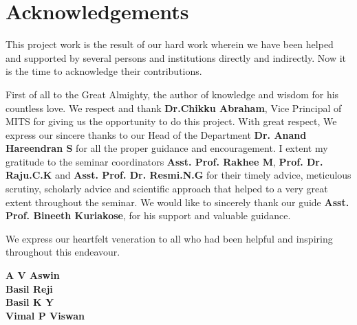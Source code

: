 \documentclass[11pt]{report}
\begin{document}
\newpage

\thispagestyle{empty}


\section*{\centering Acknowledgements}
\par This project work is the result of our hard work wherein we have been helped and supported by several persons and institutions directly and indirectly. Now it is the time to acknowledge their contributions. 

\par First of all to the Great Almighty, the author of knowledge and wisdom for his countless love. We respect and thank \textbf{Dr.Chikku Abraham}, Vice Principal of MITS for giving us the opportunity to do this project.
With great respect, We express our sincere thanks to our Head of the Department \textbf{Dr. Anand Hareendran S} for all the proper guidance and encouragement. I extent my gratitude to the seminar coordinators \textbf{Asst. Prof. Rakhee M}, \textbf{Prof. Dr. Raju.C.K} and \textbf{Asst. Prof. Dr.  Resmi.N.G} for their timely advice, meticulous scrutiny, scholarly advice and scientific approach that helped to a very great extent throughout the seminar. We would like to sincerely thank our guide \textbf{Asst. Prof. Bineeth Kuriakose}, for his support and valuable guidance.

\par We express our heartfelt veneration to all who had been helpful and inspiring throughout this endeavour.
\newline

\noindent\textbf{A V Aswin \\
Basil Reji \\
Basil K Y  \\
Vimal P Viswan}



\newpage
\vspace{2cm}
\end{document}
